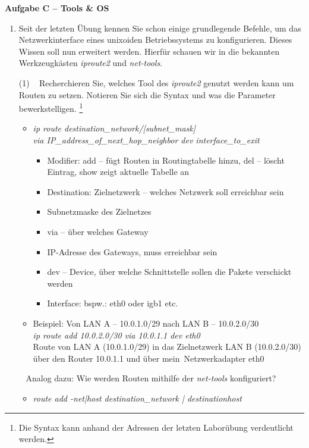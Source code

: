 \documentclass[paper=a4,fontsize=11pt]{scrartcl}%
\numberwithin{equation}{section}
\begin{document}
\begin{center}
\Large{\textbf{Aufgabe C -- Tools \& OS}}
\begin{enumerate}
	\item Seit der letzten Übung kennen Sie schon einige grundlegende Befehle, um das Netzwerkinterface eines unixoiden Betriebssystems zu konfigurieren. Dieses Wissen soll nun erweitert werden. Hierfür schauen wir in die bekannten Werkzeugkästen \emph{iproute2} und \emph{net-tools}.
	\begin{tasks}(1)
	\task~ Recherchieren Sie, welches Tool des \emph{iproute2} genutzt werden kann um Routen zu setzen. Notieren Sie sich die Syntax und was die Parameter bewerkstelligen. \footnote{Die Syntax kann anhand der Adressen der letzten Laborübung verdeutlicht werden.}
	\begin{itemize}
		\item \emph{ip route destination\_network/[subnet\_mask] \\via IP\_address\_of\_next\_hop\_neighbor dev interface\_to\_exit}
		\begin{itemize}
			\item Modifier: add -- fügt Routen in Routingtabelle hinzu, del -- löscht Eintrag, show zeigt aktuelle Tabelle an
			\item Destination: Zielnetzwerk -- welches Netzwerk soll erreichbar sein
			\item Subnetzmaske des Zielnetzes
			\item via -- über welches Gateway
			\item IP-Adresse des Gateways, muss erreichbar sein
			\item dev -- Device, über welche Schnittstelle sollen die Pakete verschickt werden
			\item Interface: bspw.: eth0 oder igb1 etc.
		\end{itemize}		 
		\item Beispiel: Von LAN A -- 10.0.1.0/29 nach LAN B -- 10.0.2.0/30\\ \emph{ip route add 10.0.2.0/30 via 10.0.1.1 dev eth0}\\
		Route von LAN A (10.0.1.0/29) in das Zielnetzwerk LAN B (10.0.2.0/30) über den Router 10.0.1.1 und über \glqq mein\grqq\ Netzwerkadapter eth0
	\end{itemize}
	\task~ Analog dazu: Wie werden Routen mithilfe der \emph{net-tools} konfiguriert?
	\begin{itemize}
		\item \emph{route add -net|host destination\_network | destinationhost \\
}
\end{itemize}
\end{tasks}
\end{enumerate}
\end{center}
\end{document}

